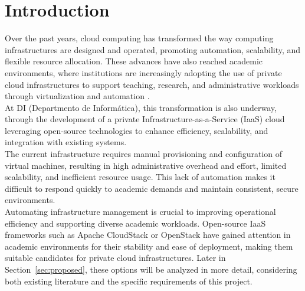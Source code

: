 \documentclass[sigplan]{acmart}
\begin{document}
\pagestyle{plain} %

\maketitle
\section{Introduction} \label{sec:introduction}

    Over the past years, cloud computing has transformed the way computing infrastructures are designed and operated, promoting automation, scalability, and flexible resource allocation. These advances have also reached academic environments, where institutions are increasingly adopting the use of private cloud infrastructures to support teaching, research, and administrative workloads through virtualization and automation \cite{alvesUsingCloudBuild2014, bonnerUsingOpenStackImprove2013, oleksiukComparativeStudySupport2021, sheelaDeployingOpenStackCloud2017, vijayakumarPrivateCloudInfrastructure2025}.\\
    
    At DI (Departmento de Informática), this transformation is also underway, through the development of a private Infrastructure-as-a-Service (IaaS) cloud leveraging open-source technologies to enhance efficiency, scalability, and integration with existing systems.\\
    
    The current infrastructure requires manual provisioning and configuration of virtual machines, resulting in high administrative overhead and effort, limited scalability, and inefficient resource usage. This lack of automation makes it difficult to respond quickly to academic demands and maintain consistent, secure environments.\\
    
    Automating infrastructure management is crucial to improving operational efficiency and supporting diverse academic workloads. Open-source IaaS frameworks such as Apache CloudStack\cite{IntroductionApacheCloudStack} or OpenStack\cite{openstack_software} have gained attention in academic environments for their stability and ease of deployment, making them suitable candidates for private cloud infrastructures. Later in Section~\ref{sec:proposed}, these options will be analyzed in more detail, considering both existing literature and the specific requirements of this project.\\
    
\end{document}
